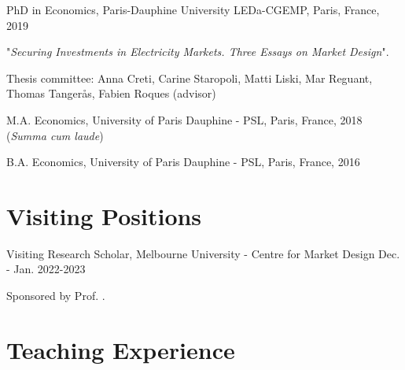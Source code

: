 \documentclass[letterpaper]{article}
\newcommand{\MYhref}[3][darkblue]{\href{#2}{\color{#1}{#3}}}%
\renewenvironment{itemize}{
  \begin{list}{}{
    \setlength{\leftmargin}{1.5em}
  }
}{
  \end{list}
}
\begin{document}
\begin{itemize}
  \item PhD in Economics, Paris-Dauphine University LEDa-CGEMP, Paris, France, 2019
\begin{itemize}
    \item "\textit{Securing Investments in Electricity Markets. Three Essays on Market Design}".
    \item Thesis committee: Anna Creti, Carine Staropoli, Matti Liski, Mar Reguant, Thomas Tangerås, Fabien Roques (advisor)
\end{itemize}


  \item M.A. Economics, University of Paris Dauphine - PSL, Paris, France, 2018  (\textit{Summa cum laude})
  
  \item B.A. Economics, University of Paris Dauphine - PSL, Paris, France, 2016

\end{itemize}



\section*{\textbf{Visiting Positions}}

\begin{itemize}
\item Visiting Research Scholar, Melbourne University - Centre for Market Design \hfill Dec. - Jan. 2022-2023
\item Sponsored by Prof. \textcolor{darkcerulean}{\MYhref{https://sites.google.com/view/dprbyrne}{David Byrne}}. 
\end{itemize}


\section*{\textbf{Teaching Experience}}
\end{document}
